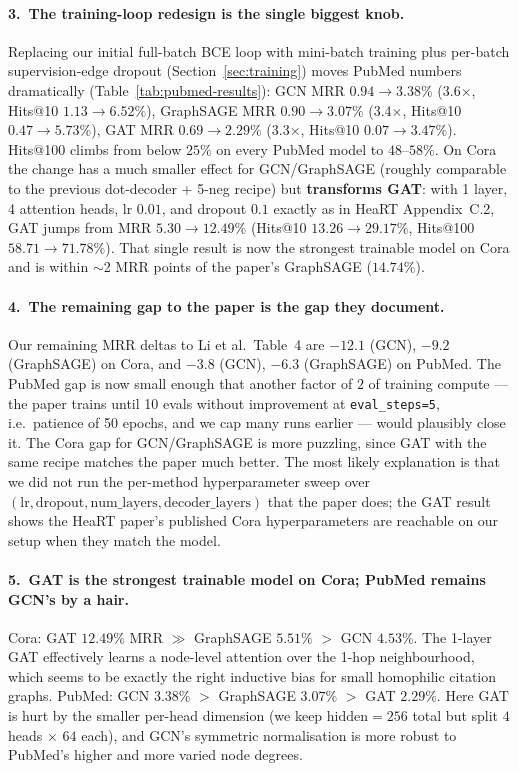 \documentclass[10pt,a4paper]{article}
\begin{document}
\paragraph{3.\ The training-loop redesign is the single biggest knob.}
Replacing our initial full-batch BCE loop with mini-batch training plus
per-batch supervision-edge dropout (Section~\ref{sec:training}) moves
PubMed numbers dramatically (Table~\ref{tab:pubmed-results}):
GCN MRR $0.94 \to 3.38\%$ (3.6$\times$, Hits@10 $1.13 \to 6.52\%$),
GraphSAGE MRR $0.90 \to 3.07\%$ (3.4$\times$, Hits@10 $0.47 \to 5.73\%$),
GAT MRR $0.69 \to 2.29\%$ (3.3$\times$, Hits@10 $0.07 \to 3.47\%$).
Hits@100 climbs from below $25\%$ on every PubMed model to $48$--$58\%$.
On Cora the change has a much smaller effect for GCN/GraphSAGE
(roughly comparable to the previous dot-decoder + 5-neg recipe) but
\textbf{transforms GAT}: with 1 layer, 4 attention heads, lr $0.01$,
and dropout $0.1$ exactly as in HeaRT Appendix~C.2, GAT jumps from
MRR $5.30 \to 12.49\%$ (Hits@10 $13.26 \to 29.17\%$,
Hits@100 $58.71 \to 71.78\%$). That single result is now the strongest
trainable model on Cora and is within $\sim$2 MRR points of the paper's
GraphSAGE ($14.74\%$).

\paragraph{4.\ The remaining gap to the paper is the gap they document.}
Our remaining MRR deltas to Li et al.\ Table~4 are
$-12.1$ (GCN), $-9.2$ (GraphSAGE) on Cora, and $-3.8$ (GCN), $-6.3$
(GraphSAGE) on PubMed. The PubMed gap is now small enough that another
factor of $2$ of training compute --- the paper trains until 10 evals
without improvement at \texttt{eval\_steps=5}, i.e.\ patience of 50
epochs, and we cap many runs earlier --- would plausibly close it. The
Cora gap for GCN/GraphSAGE is more puzzling, since GAT with the same
recipe matches the paper much better. The most likely explanation is
that we did not run the per-method hyperparameter sweep over
$(\text{lr}, \text{dropout}, \text{num\_layers},
\text{decoder\_layers})$ that the paper does; the GAT result shows the
HeaRT paper's published Cora hyperparameters are reachable on our setup
when they match the model.

\paragraph{5.\ GAT is the strongest trainable model on Cora; PubMed remains GCN's by a hair.}
Cora: GAT $12.49\%$ MRR $\gg$ GraphSAGE $5.51\%$ $>$ GCN $4.53\%$. The
1-layer GAT effectively learns a node-level attention over the
1-hop neighbourhood, which seems to be exactly the right inductive bias
for small homophilic citation graphs.
PubMed: GCN $3.38\%$ $>$ GraphSAGE $3.07\%$ $>$ GAT $2.29\%$. Here GAT
is hurt by the smaller per-head dimension (we keep $\text{hidden} = 256$
total but split $4$ heads $\times$ $64$ each), and GCN's symmetric
normalisation is more robust to PubMed's higher and more varied node
degrees.
\end{document}
